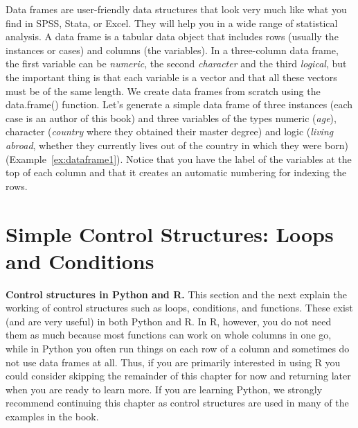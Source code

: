 Data frames are user-friendly data structures that look very much like
what you find in SPSS, Stata, or Excel. They will help you in a wide
range of statistical analysis.  A
data frame is a tabular data object that includes rows (usually the
instances or cases) and columns (the variables). In a three-column data frame,
the first variable can be \emph{numeric}, the second \emph{character}
and the third \emph{logical}, but the important thing is that each
variable is a vector and that all these vectors must be of the same
length. We create data frames from scratch using the data.frame()
function.  Let’s generate a simple data frame of three instances (each
case is an author of this book) and three variables of the types
numeric (\emph{age}), character (\emph{country} where they obtained their
master degree) and logic (\emph{living abroad}, whether they currently
lives out of the country in which they were born) (Example~\ref{ex:dataframe1}).
Notice that you have the label of the variables at the top of each column and that it creates an automatic numbering for indexing the rows.  


%

\section{Simple Control Structures: Loops and Conditions}	
\label{sec:controlstructures}

\begin{feature}\textbf{Control structures in Python and R.}
  This section and the next explain the working of control structures
  such as loops, conditions, and functions.
  These exist (and are very useful) in both Python and R.
  In R, however, you do not need them as much because most functions
  can work on whole columns in one go, while in Python you often run things
  on each row of a column and sometimes do not use data frames at all.
  Thus, if you are primarily interested in using R you could consider skipping
  the remainder of this chapter for now and returning later when you are ready to learn more.
  If you are learning Python, we strongly recommend continuing this chapter as
  control structures are used in many of the examples in the book.
  \end{feature}
  


